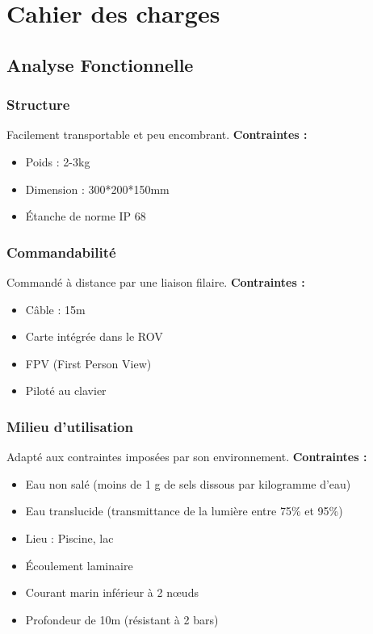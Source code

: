 \documentclass[a4paper,11pt]{report}
\begin{document}
				
\chapter{Cahier des charges}

        \section{Analyse Fonctionnelle}
						\subsection{Structure}
								Facilement transportable et peu encombrant.\newline
								\textbf{Contraintes :}
								\begin{itemize}
										\item Poids : 2-3kg
										\item Dimension : 300*200*150mm
										\item Étanche de norme IP 68 \newline \newline
									\end{itemize}

						\subsection{Commandabilité}
								Commandé à distance par une liaison filaire.\newline
								\textbf{Contraintes :}
								\begin{itemize}
										\item Câble : 15m
										\item Carte intégrée dans le ROV
										\item FPV (First Person View)
										\item Piloté au clavier\newline \newline
								\end{itemize}

						\subsection{Milieu d'utilisation}
								Adapté aux contraintes imposées par son environnement. \newline
								\textbf{Contraintes :}
								\begin{itemize}
										\item Eau non salé (moins de 1 g de sels dissous par kilogramme d'eau)
										\item Eau translucide (transmittance de la lumière entre 75\% et 95\%)
										\item Lieu : Piscine, lac
										\item Écoulement laminaire
										\item Courant marin inférieur à 2 nœuds
										\item Profondeur de 10m (résistant à 2 bars) \newline \newline
								\end{itemize}
\end{document}
